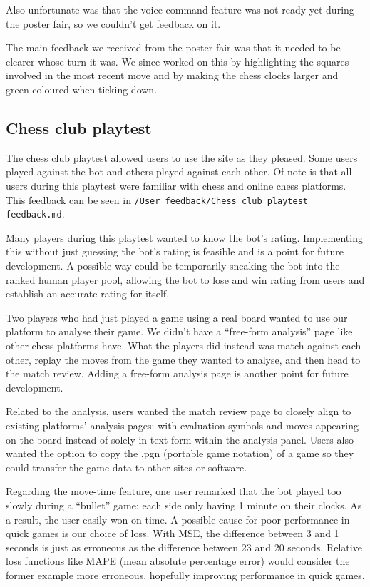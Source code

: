 \documentclass[12pt,titlepage,a4paper]{article}
\begin{document}
    Also unfortunate was that the voice command feature was not ready yet during the poster fair, so we couldn't get feedback on it.

    The main feedback we received from the poster fair was that it needed to be clearer whose turn it was. We since worked on this by highlighting the squares involved in the most recent move and by making the chess clocks larger and green-coloured when ticking down.

    \subsection{Chess club playtest}

    The chess club playtest allowed users to use the site as they pleased. Some users played against the bot and others played against each other. Of note is that all users during this playtest were familiar with chess and online chess platforms. This feedback can be seen in \texttt{/User feedback/Chess club playtest feedback.md}.

    Many players during this playtest wanted to know the bot's rating. Implementing this without just guessing the bot's rating is feasible and is a point for future development. A possible way could be temporarily sneaking the bot into the ranked human player pool, allowing the bot to lose and win rating from users and establish an accurate rating for itself.

    Two players who had just played a game using a real board wanted to use our platform to analyse their game. We didn't have a ``free-form analysis'' page like other chess platforms have. What the players did instead was match against each other, replay the moves from the game they wanted to analyse, and then head to the match review. Adding a free-form analysis page is another point for future development.

    Related to the analysis, users wanted the match review page to closely align to existing platforms' analysis pages: with evaluation symbols and moves appearing on the board instead of solely in text form within the analysis panel. Users also wanted the option to copy the .pgn (portable game notation) of a game so they could transfer the game data to other sites or software.

    Regarding the move-time feature, one user remarked that the bot played too slowly during a ``bullet'' game: each side only having 1 minute on their clocks. As a result, the user easily won on time. A possible cause for poor performance in quick games is our choice of loss. With MSE, the difference between 3 and 1 seconds is just as erroneous as the difference between 23 and 20 seconds. Relative loss functions like MAPE (mean absolute percentage error) would consider the former example more erroneous, hopefully improving performance in quick games.
\end{document}
